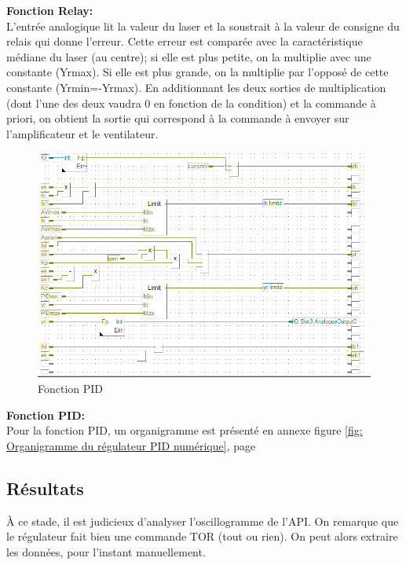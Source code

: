 \textbf{Fonction Relay:}\\
L'entrée analogique lit la valeur du laser et la soustrait à la valeur de consigne du relais qui donne l'erreur. Cette erreur est comparée avec la caractéristique médiane du laser (au centre); si elle est plus petite, on la multiplie avec une constante (Yrmax). Si elle est plus grande, on la multiplie par l'opposé de cette constante (Yrmin=-Yrmax). En additionnant les deux sorties de multiplication (dont l'une des deux vaudra 0 en fonction de la condition) et la commande à priori, on obtient la sortie qui correspond à la commande à envoyer sur l'amplificateur et le ventilateur.\\


\begin{figure}[h]
	\centering
	\includegraphics[width=\linewidth]{img/SAIA_PID}
	\caption{Fonction PID}
	\label{fig:Fonction PID}
\end{figure}	

\textbf{Fonction PID:}\\
Pour la fonction PID, un organigramme est présenté en annexe figure \ref{fig: Organigramme du régulateur PID numérique}, page \pageref{fig: Organigramme du régulateur PID numérique}


\subsection{Résultats}

\`{A} ce stade, il est judicieux d'analyser l'oscillogramme de l'API. On remarque que le régulateur fait bien une commande TOR (tout ou rien). On peut alors extraire les données, pour l'instant manuellement.

